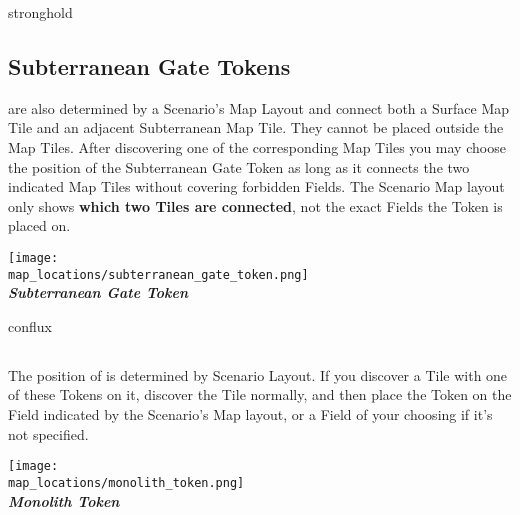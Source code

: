 \begin{multicols}{2}
\begin{expansion}[before=\vspace*{-11mm}]{stronghold}
  \subsection*{Subterranean Gate Tokens}
   are also determined by a Scenario's Map Layout and connect both a Surface Map Tile and an adjacent Subterranean Map Tile.
  They cannot be placed outside the Map Tiles.
  After discovering one of the corresponding Map Tiles you may choose the position of the Subterranean Gate Token as long as it connects the two indicated Map Tiles without covering forbidden Fields.
  The Scenario Map layout only shows \textbf{which two Tiles are connected}, not the exact Fields the Token is placed on.
  \bigskip
  \begin{center}
    \texttt{[image: \\map\_locations/subterranean\_gate\_token.png]}\\
    \footnotesize{\textbf{\textit{\textcolor{darkcandyapplered}{Subterranean Gate Token}}}}
  \end{center}
\end{expansion}

\bigskip

\begin{expansion}[before=\vspace*{0pt}]{conflux}
  \subsection*{}
   The position of  is determined by Scenario Layout.
   If you discover a Tile with one of these Tokens on it, discover the Tile normally, and then place the Token on the Field indicated by the Scenario's Map layout, or a Field of your choosing if it's not specified.
  \bigskip
  \begin{center}
    \texttt{[image: \\map\_locations/monolith\_token.png]}\\
    \footnotesize{\textbf{\textit{\textcolor{darkcandyapplered}{Monolith Token}}}}
  \end{center}
\end{expansion}
\end{multicols}
